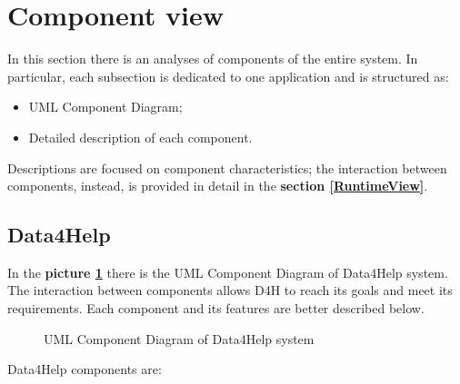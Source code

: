 \section{Component view}
\label{ComponentView}

In this section there is an analyses of components of the entire system.
In particular, each subsection is dedicated to one application and is structured as:
\begin{itemize}
    \item UML Component Diagram;
    \item Detailed description of each component.
\end{itemize}
Descriptions are focused on component characteristics; the interaction between components, instead, is provided in detail in the \textbf{ section \ref{RuntimeView}}. 

\subsection{Data4Help}

In the \textbf{picture \ref{fig:D4H-component}} there is the UML Component Diagram of Data4Help system. The interaction between components allows D4H to reach its goals and meet its requirements. Each component and its features are better described below. 

\begin{figure}[H]
    \centering
    \caption{UML Component Diagram of Data4Help system}
    \label{fig:D4H-component}
\end{figure}

Data4Help components are:

